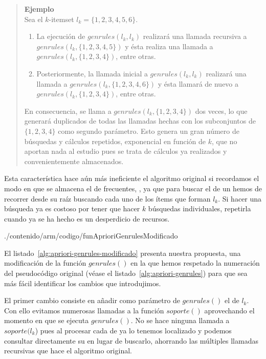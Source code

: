 \begin{quote}
\textbf{Ejemplo}\\
Sea el $k$-itemset $l_k = \{1, 2, 3, 4, 5, 6\}$.
\begin{enumerate}
    \item La ejecución de $genrules(l_k, l_k)$ realizará una llamada recursiva a $genrules(l_k, \{1, 2, 3, 4, 5\})$ y ésta realiza una llamada a $genrules(l_k, \{1, 2, 3, 4\})$, entre otras.
    \item Posteriormente, la llamada inicial a $genrules(l_k, l_k)$ realizará una llamada a $genrules(l_k, \{1, 2, 3, 4, 6\})$  y ésta llamará de nuevo a $genrules(l_k, \{1, 2, 3, 4\})$, entre otras.
\end{enumerate}
En consecuencia, se llama a $genrules(l_k, \{1, 2, 3, 4\})$ dos veces, lo que generará duplicados de todas las llamadas hechas con los subconjuntos de $\{1, 2, 3, 4\}$ como segundo parámetro. Esto genera un gran número de búsquedas y cálculos repetidos, exponencial en función de $k$, que no aportan nada al estudio pues se trata de cálculos ya realizados y convenientemente almacenados.
\end{quote}

Esta característica hace aún más ineficiente el algoritmo original si recordamos el modo en que se almacena el \dataset de \itemsets frecuentes, \aprioriL, ya que para buscar el \soporte de un \kitemset hemos de recorrer \aprioriL desde su raíz buscando cada uno de los ítems que forman $l_k$. Si hacer una búsqueda ya es costoso por tener que hacer $k$ búsquedas individuales, repetirla cuando ya se ha hecho es un desperdicio de recursos.


                 {./contenido/arm/codigo/funAprioriGenrulesModificado}

El listado~\ref{alg:apriori-genrules-modificado} presenta nuestra propuesta, una modificación de la función $genrules()$ en la que hemos respetado la numeración del pseudocódigo original (véase el listado~\ref{alg:apriori-genrules}) para que sea más fácil identificar los cambios que introdujimos.

El primer cambio consiste en añadir como parámetro de $genrules()$ el \soporte de $l_k$. Con ello evitamos numerosas llamadas a la función $soporte()$ aprovechando el momento en que se ejecuta $genrules()$. No se hace ninguna llamada a $soporte(l_k$) pues al procesar cada \kitemset de \aprioriL ya lo tenemos localizado y podemos consultar directamente su \soporte en lugar de buscarlo, ahorrando las múltiples llamadas recursivas que hace el algoritmo original.

